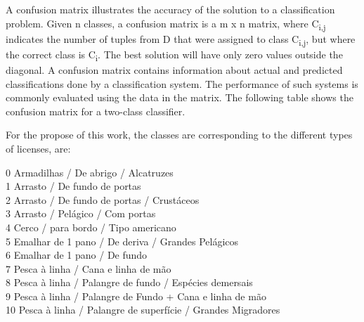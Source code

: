 A confusion matrix \cite{CMPatil} illustrates the accuracy of the solution to a classification problem. Given n classes, a confusion matrix is a m x n matrix, where C\textsubscript{i,j} indicates the number of tuples from D that were assigned to class C\textsubscript{i,j}, but where the correct class is C\textsubscript{i}.
The best solution will have only zero values outside the diagonal.
A confusion matrix contains information about actual and predicted classifications done by a classification system. The performance of such systems is commonly evaluated using the data in the matrix. The following table shows the confusion matrix for a two-class classifier. 

For the propose of this work, the classes are corresponding to the different types of licenses, are: 

0 Armadilhas / De abrigo / Alcatruzes \\
1 Arrasto / De fundo de portas \\
2 Arrasto / De fundo de portas / Crustáceos\\
3 Arrasto / Pelágico / Com portas\\
4 Cerco / para bordo / Tipo americano\\
5 Emalhar de 1 pano / De deriva / Grandes Pelágicos\\
6 Emalhar de 1 pano / De fundo\\
7 Pesca à linha / Cana e linha de mão\\
8 Pesca à linha / Palangre de fundo / Espécies demersais\\
9 Pesca à linha / Palangre de Fundo + Cana e linha de mão\\
10 Pesca à linha / Palangre de superfície / Grandes Migradores



